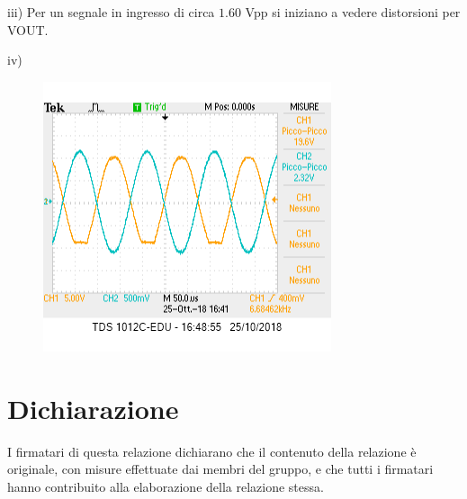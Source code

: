 \documentclass[10pt,a4paper]{article}
\begin{document}
iii) Per un segnale in ingresso di circa $1.60$ \si{\volt}pp si iniziano a vedere distorsioni per VOUT.

iv)\begin{figure}[h]
	\centering
	\includegraphics[scale=0.5]{clipping.png}

	
	
\end{figure}

	

\section*{Dichiarazione}
I firmatari di questa relazione dichiarano che il contenuto della relazione \`e originale, con misure effettuate dai membri del gruppo, e che tutti i firmatari hanno contribuito alla elaborazione della relazione stessa.
\end{document}
